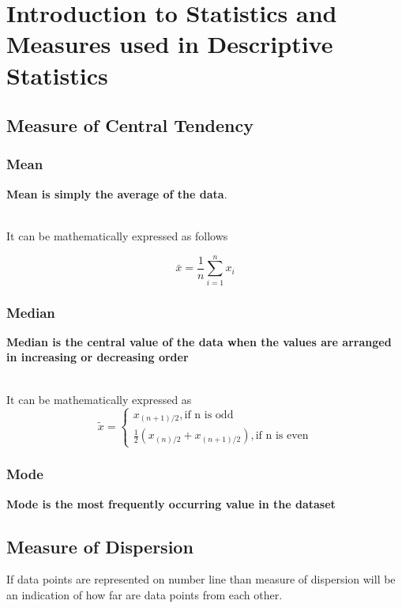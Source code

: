 \documentclass[twoside,12pt]{report}  %
\begin{document}
\setcounter{page}{1}

\chapter{Introduction to Statistics and Measures used in Descriptive Statistics}
\section{Measure of Central Tendency}
\noindent
\subsection{Mean}
\begin{tcolorbox}[colback=red!5!white,colframe=red!75!black, title= \textbf{Mean}]
	\textbf{Mean is simply the average of the data}. 
\end{tcolorbox}
\noindent
\\
It can be mathematically expressed as follows

$$\bar{x} = \frac{1}{n}\sum_{i=1}^{n}x_i$$
%
\subsection{Median}
\begin{tcolorbox}[colback=red!5!white,colframe=red!75!black, title= \textbf{Median}]
	\textbf{Median is the central value of the data when the values are arranged in increasing or decreasing order}
\end{tcolorbox}
\noindent
\\
It can be mathematically expressed as
$$\widetilde{x} = \left\{
				   		\begin{array}{ll}
				   			x_{(n+1)/2}, \mbox{if n is odd}                                      \\
				   			\frac{1}{2}\left(x_{(n)/2} + x_{(n+1)/2}\right), \mbox{if n is even}
				   		\end{array}	
                    \right.
$$
\subsection{Mode}
\begin{tcolorbox}[colback=red!5!white,colframe=red!75!black, title= \textbf{Mode}]
	\textbf{Mode is the most frequently occurring value in the dataset} 
\end{tcolorbox}

\section{Measure of Dispersion}
If data points are represented on number line than measure of dispersion will be an indication of how far are data points from each other. 
\end{document}
